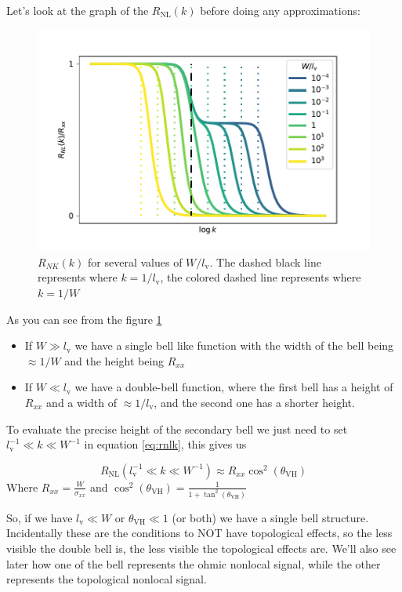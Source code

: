 Let's look at the graph of the $R_{\textrm{NL}}(k)$ before doing any approximations:
\begin{figure}[h!]
    \centering
    \includegraphics[width=\linewidth]{Immagini/rnl/widths.pdf}
    \caption{$R_{NK}(k)$ for several values of $W/l_\textrm{v}$. The dashed black line represents where $k=1/l_\textrm{v}$, the colored dashed line represents where $k=1/W$}
    \label{fig:RNLk}
\end{figure}
As you can see from the figure \ref{fig:RNLk} 
\begin{itemize}
    \item If $W\gg l_\textrm{v}$ we have a single bell like function with the width of the bell being $\approx 1/W$ and the height being $R_{xx}$ 
    \item If $W\ll l_\textrm{v}$ we have a double-bell function, where the first bell has a height of $R_{xx}$ and a width of $\approx 1/l_\textrm{v}$, and the second one has a shorter height.
\end{itemize}    
To evaluate the precise height of the secondary bell we just need to set $l_\textrm{v}^{-1}\ll k \ll W^{-1}$ in equation \ref{eq:rnlk}, this gives us

\begin{equation}
    R_{\textrm{NL}}(l_\textrm{v}^{-1}\ll k \ll W^{-1})\approx R_{xx}\cos^2(\theta_{\textrm{VH}})   
    \label{eq:plateau} 
\end{equation}
Where $R_{xx}=\frac{W}{\sigma_{xx}}$ and $\cos^2(\theta_{\textrm{VH}})=\frac{1}{1+\tan^2(\theta_{\textrm{VH}})}$

So, if we have $l_\textrm{v}\ll W$ or $\theta_{\textrm{VH}}\ll 1$ (or both) we have a single bell structure. Incidentally these are the conditions to NOT have topological effects, so the less visible the double bell is, the less visible the topological effects are. We'll also see later how one of the bell represents the ohmic nonlocal signal, while the other represents the topological nonlocal signal. 

